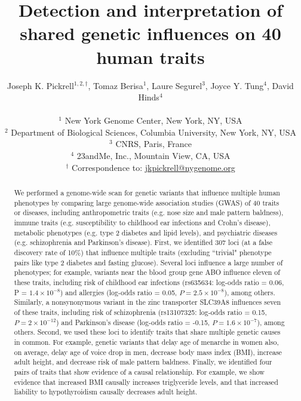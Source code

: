 \documentclass[11pt,titlepage]{article}
\begin{document}
\title{Detection and interpretation of shared genetic influences on 40 human traits}
\author{Joseph K. Pickrell$^{1,2, \dagger}$, Tomaz Berisa${^1}$, Laure Segurel$^{3}$, Joyce Y. Tung${^4}$, David Hinds${^4}$\\ \\
\small $^1$ New York Genome Center, New York, NY, USA\\
\small $^2$ Department of Biological Sciences, Columbia University, New York, NY, USA \\
\small $^3$ CNRS, Paris, France \\
\small $^4$ 23andMe, Inc., Mountain View, CA, USA\\
\small $^\dagger$ Correspondence to: \url{jkpickrell@nygenome.org}
}
\maketitle
\begin{abstract}
We performed a genome-wide scan for genetic variants that influence multiple human phenotypes by comparing large genome-wide association studies (GWAS) of 40 traits or diseases, including anthropometric traits (e.g. nose size and male pattern baldness), immune traits (e.g. susceptibility to childhood ear infections and Crohn's disease), metabolic phenotypes (e.g. type 2 diabetes and lipid levels), and psychiatric diseases (e.g. schizophrenia and Parkinson's disease). First, we identified 307 loci (at a false discovery rate of 10\%) that influence multiple traits (excluding ``trivial" phenotype pairs like type 2 diabetes and fasting glucose). Several loci influence a large number of phenotypes; for example, variants near the blood group gene ABO influence eleven of these traits, including risk of childhood ear infections (rs635634: log-odds ratio = 0.06, P = $1.4 \times 10^{-8}$) and allergies (log-odds ratio = 0.05, $P = 2.5\times 10^{-8}$), among others. Similarly, a nonsynonymous variant in the zinc transporter SLC39A8 influences seven of these traits, including risk of schizophrenia (rs13107325: log-odds ratio = 0.15, $P = 2 \times 10^{-12}$) and Parkinson's disease (log-odds ratio = -0.15, $P = 1.6 \times 10^{-7}$), among others. Second, we used these loci to identify traits that share multiple genetic causes in common. For example, genetic variants that delay age of menarche in women also, on average, delay age of voice drop in men, decrease body mass index (BMI), increase adult height, and decrease risk of male pattern baldness. Finally, we identified four pairs of traits that show evidence of a causal relationship. For example, we show evidence that increased BMI causally increases triglyceride levels, and that increased liability to hypothyroidism causally decreases adult height.   
\end{abstract}
\clearpage
\end{document}

